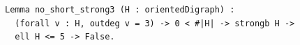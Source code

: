 \begin{lstlisting}[language=Rocq]
Lemma no_short_strong3 (H : orientedDigraph) :
  (forall v : H, outdeg v = 3) -> 0 < #|H| -> strongb H ->
  ell H <= 5 -> False.
\end{lstlisting}
